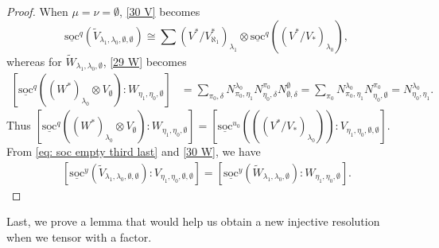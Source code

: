 \documentclass[openany, a4paper]{amsbook}
\theoremstyle{definition}
\numberwithin{equation}{chapter}
\newcommand{\socl}[2]{\underline{\mathrm{soc}}^{#1}({#2})}
\begin{document}
\begin{proof}
    When $\mu = \nu = \emptyset$, \eqref{30 V} becomes
    \begin{equation}\label{eq: soc empty third last}
        \socl{q}{\tilde{V}_{\lambda_1, \lambda_0, \emptyset, \emptyset}} \cong \sum  (V^\ast/V^{\ast}_{\aleph_1})_{\lambda_1} \otimes \socl{q}{(V^\ast/V_\ast)_{\lambda_0}},
    \end{equation}
    whereas for $\tilde{W}_{\lambda_1, \lambda_0, \emptyset}$,  \eqref{29 W} becomes
    \begin{align*}
        \left[ \socl{q}{(W^\ast)_{\lambda_0} \otimes V_\emptyset } \colon W_{\eta_1, \eta_0, \emptyset }  \right] &= \sum_{\pi_0, \delta} N^{\lambda_0}_{\pi_0, \eta_1} N^{\pi_0}_{\eta_0, \delta} N^{\emptyset}_{\emptyset, \delta} = \sum_{\pi_0} N^{\lambda_0}_{\pi_0, \eta_1} N^{\pi_0}_{\eta_0, \emptyset} =  N^{\lambda_0}_{\eta_0, \eta_1}.
    \end{align*}
    Thus $\left[ \socl{q}{(W^\ast)_{\lambda_0} \otimes V_\emptyset } \colon W_{\eta_1, \eta_0, \emptyset }  \right] = \left[ \socl{u_0}{((V^\ast/V_\ast)_{\lambda_0})} \colon V_{\eta_1, \eta_0, \emptyset, \emptyset }  \right]$. From \eqref{eq: soc empty third last} and \eqref{30 W}, we have
    \begin{align*}
        \left[ \socl{y}{\tilde{V}_{\lambda_1, \lambda_0, \emptyset, \emptyset}} \colon V_{\eta_1, \eta_0, \emptyset, \emptyset }  \right] = 
        \left[ \socl{y}{\tilde{W}_{\lambda_1, \lambda_0, \emptyset}} \colon W_{\eta_1, \eta_0, \emptyset }  \right].
    \end{align*}
\end{proof}

Last, we prove a lemma that would help us obtain a new injective resolution when we tensor with a factor.
\end{document}
